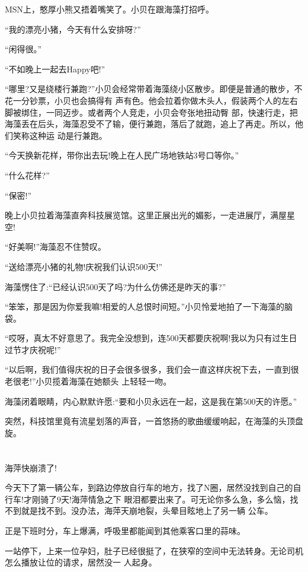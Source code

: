 \documentclass[11pt,a4paper,onecolumn]{article}
\begin{document}
MSN上，憨厚小熊又捂着嘴笑了。小贝在跟海藻打招呼。

``我的漂亮小猪，今天有什么安排呀?''

``闲得很。''

``不如晚上一起去Happy吧!''

``哪里?又是绕楼行兼跑?''小贝会经常带着海藻绕小区散步。即便是普通的散步，不花一分钞票，小贝也会搞得有
声有色。他会拉着你做木头人，假装两个人的左右脚被绑住，一同迈步。或者两个人竞走，小贝会夸张地扭动臀
部，快速行走，把海藻丢在后头，海藻忍受不了输，便行兼跑，落后了就跑，追上了再走。所以，他们笑称这种运
动是行兼跑。

``今天换新花样，带你出去玩!晚上在人民广场地铁站3号口等你。''

``什么花样?''

``保密!''

晚上小贝拉着海藻直奔科技展览馆。这里正展出光的媚影，一走进展厅，满屋星空!

``好美啊!''海藻忍不住赞叹。

``送给漂亮小猪的礼物!庆祝我们认识500天!''

海藻愣住了:``已经认识500天了吗?为什么仿佛还是昨天的事?''

``笨笨，那是因为你爱我嘛!相爱的人总恨时间短。''小贝怜爱地拍了一下海藻的脑袋。

``哎呀，真太不好意思了。我完全没想到，连500天都要庆祝啊!我以为只有过生日过节才庆祝呢!''

``以后啊，我们值得庆祝的日子会很多很多，我们会一直这样庆祝下去，一直到很老很老!''小贝揽着海藻在她额头
上轻轻一吻。

海藻闭着眼睛，内心默默许愿:``要和小贝永远在一起，这是我在第500天的许愿。''

突然，科技馆里竟有流星划落的声音，一首悠扬的歌曲缓缓响起，在海藻的头顶盘旋。

\section[\thesection]{}

海萍快崩溃了!

今天下了第一辆公车，到路边停放自行车的地方，找了N圈，居然没找到自己的自行车!才刚骑了9天!海萍情急之下
眼泪都要出来了。可无论你多么急，多么恼，找不到就是找不到。没办法，海萍天崩地裂，头晕目眩地上了另一辆
公车。

正是下班时分，车上爆满，呼吸里都能闻到其他乘客口里的蒜味。

一站停下，上来一位孕妇，肚子已经很挺了，在狭窄的空间中无法转身。无论司机怎么播放让位的请求，居然没一
人起身。
\end{document}
